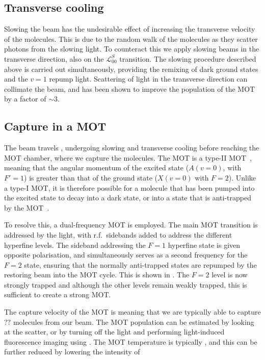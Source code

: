 \subsection*{Transverse cooling}

Slowing the beam has the undesirable effect of increasing the transverse
velocity of the molecules. This is due to the random walk of the molecules as
they scatter photons from the slowing light. To counteract this we apply
slowing beams in the transverse direction, also on the $\mathcal{L}_{00}^S$
transition. The slowing procedure described above is carried out
simultaneously, providing the remixing of dark ground states and the $v=1$
repump light.
%
Scattering of light in the transverse direction can collimate the beam, and has
been shown to improve the population of the MOT by a factor of $\sim3$. 

\subsection*{Capture in a MOT}

The \CaF{} beam travels , undergoing slowing and transverse
cooling before reaching the MOT chamber, where we capture the molecules. The
\CaF{} MOT is a type-II MOT~\cite{}, meaning that the angular momentum of the
excited state ($A(v=0)$, with $F'=1$) is greater than that of the ground state
($X(v=0)$ with $F=2$). Unlike a type-I MOT, it is therefore possible for a
molecule that has been pumped into the excited state to decay into a dark
state, or into a state that is anti-trapped by the MOT~\cite{}.

To resolve this, a dual-frequency MOT is employed. The main MOT transition is
addressed by the  light, with r.f.\ sidebands added to address
the different hyperfine levels. The sideband addressing the $F=1$ hyperfine
state is given opposite polarisation, and simultaneously serves as a second
frequency for the $F=2$ state, ensuring that the normally anti-trapped states
are repumped by the restoring beam into the MOT cycle. This is shown in . The $F=2$ level is now strongly trapped and although the other levels
remain weakly trapped, this is sufficient to create a strong MOT.

The capture velocity of the MOT is  meaning that we are typically able
to capture $??$ molecules from our beam. The MOT population can be estimated by
looking at the scatter, or by turning off the light and performing
light-induced fluorescence imaging using . The MOT temperature is
typically \cm{}, and this can be further reduced by lowering the intensity of
~\cite{Truppe2017} 

